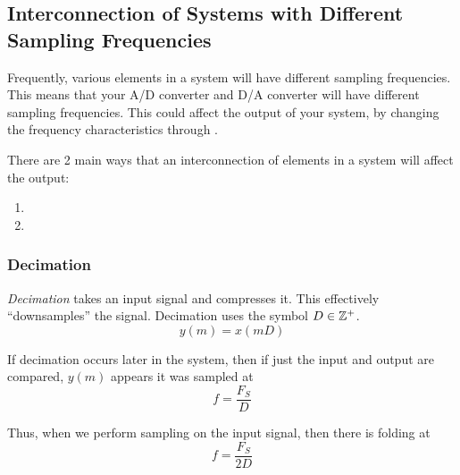 \subsection{Interconnection of Systems with Different Sampling Frequencies}\label{subsec:Interconnect_Different_Sampling_Frequency}
Frequently, various elements in a system will have different sampling frequencies.
This means that your A/D converter and D/A converter will have different sampling frequencies.
This could affect the output of your system, by changing the frequency characteristics through .

There are 2 main ways that an interconnection of elements in a system will affect the output:
\begin{enumerate}[noitemsep]
\item {}
\item {}
\end{enumerate}

\subsubsection{Decimation}\label{subsubsec:Decimation}
\begin{definition}[Decimation]\label{def:Decimation}
  \emph{Decimation} takes an input signal and compresses it.
  This effectively ``downsamples'' the signal.
  Decimation uses the symbol $D \in \operatorname{\mathbb{Z}^{+}}$.
  \begin{equation*}
    y(m) = x(mD)
  \end{equation*}

  If decimation occurs later in the system, then if just the input and output are compared, $y(m)$ appears it was sampled at
  \begin{equation}\label{eq:Input_Output_Decimation}
    f = \frac{F_{S}}{D}
  \end{equation}
  
  Thus, when we perform sampling on the input signal, then there is folding at
  \begin{equation}\label{eq:Decimation_Sampling_Frequency_Change}
    f = \frac{F_{S}}{2D}
  \end{equation}
\end{definition}

